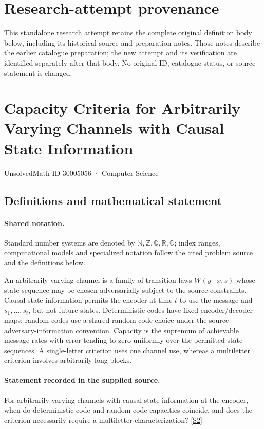 \documentclass[11pt]{article}
\begin{document}
\section*{Research-attempt provenance}
This standalone research attempt retains the complete original definition body below,
including its historical source and preparation notes. Those notes describe the
earlier catalogue preparation; the new attempt and its verification are identified
separately after that body. No original ID, catalogue status, or source statement is changed.

\section{Capacity Criteria for Arbitrarily Varying Channels with Causal State Information}\label{30005056}
{\small UnsolvedMath ID 30005056 · Computer Science}
\subsection{Definitions and mathematical statement}

\paragraph{Shared notation.}Standard number systems are denoted by $\mathbb N,\mathbb Z,\mathbb Q,\mathbb R,\mathbb C$; index ranges, computational models and specialized notation follow the cited problem source and the definitions below.


An arbitrarily varying channel is a family of transition laws $W(y\mid x,s)$ whose state sequence may be chosen adversarially subject to the source constraints. Causal state information permits the encoder at time $t$ to use the message and $s_1,\ldots,s_t$, but not future states. Deterministic codes have fixed encoder/decoder maps; random codes use a shared random code choice under the source adversary-information convention. Capacity is the supremum of achievable message rates with error tending to zero uniformly over the permitted state sequences. A single-letter criterion uses one channel use, whereas a multiletter criterion involves arbitrarily long blocks.
\paragraph{Statement recorded in the supplied source.}
For arbitrarily varying channels with causal state information at the encoder, when do deterministic-code and random-code capacities coincide, and does the criterion necessarily require a multiletter characterization? \href{https://doi.org/10.4171/owr/2022/14}{[S2]}
\end{document}
